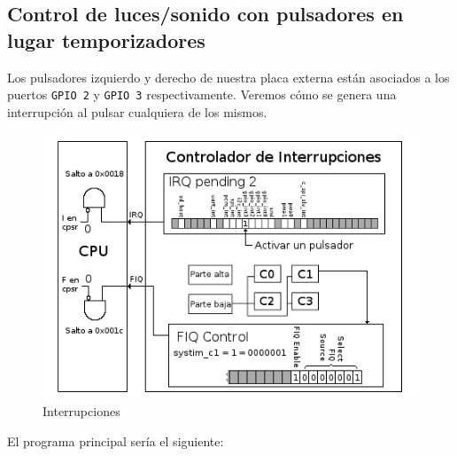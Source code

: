 \subsection{Control de luces/sonido con pulsadores en lugar temporizadores}

Los pulsadores izquierdo y derecho de nuestra placa externa están asociados a los
puertos {\tt GPIO 2} y {\tt GPIO 3} respectivamente. Veremos
cómo se genera una interrupción al pulsar cualquiera de los mismos.

\begin{figure}[h]
  \centering
    \includegraphics[width=12cm]{graphs/inter6.png}
  \caption{Interrupciones}
  \label{fig:inter6}
\end{figure}

\newpage
El programa principal sería el siguiente:

